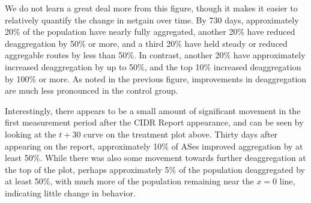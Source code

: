 We do not learn a great deal more from this figure, though it makes it easier
to relatively quantify the change in netgain over time. By 730 days,
approximately 20\% of the population have nearly fully aggregated, another 20\%
have reduced deaggregation by 50\% or more, and a third 20\% have held steady
or reduced aggregable routes by less than 50\%. In contrast, another 20\% have
approximately increased deaggregation by up to 50\%, and the top 10\% increased
deaggregation by 100\% or more. As noted in the previous figure, improvements
in deaggregation are much less pronounced in the control group.

Interestingly, there appears to be a small amount of significant movement in
the first measurement period after the CIDR Report appearance, and can be seen
by looking at the $t+30$ curve on the treatment plot above. Thirty days after
appearing on the report, approximately 10\% of ASes improved aggregation by at
least 50\%. While there was also some movement towards further deaggregation at
the top of the plot, perhaps approximately 5\% of the population deaggregated
by at least 50\%, with much more of the population remaining near the $x=0$
line, indicating little change in behavior.

